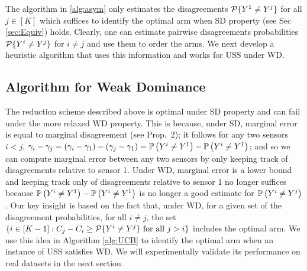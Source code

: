 The algorithm in \ref{alg:asym} only estimates the disagreements $\P\{Y^1 \neq Y^j\}$ for all $j \in [K]$ which suffices to identify the optimal arm when SD property (see Sec \ref{sec:Equiv}) holds. Clearly, one can estimate pairwise disagreements probabilities $\P\{Y^i \neq Y^j\}$ for $i\neq j$ and use them to order the arms. We next develop a heuristic algorithm that uses this information and works for USS under WD. 

\subsection{Algorithm for Weak Dominance}
The reduction scheme described above is optimal under SD property and can fail under the more relaxed WD property. This is because, under SD, marginal error is equal to marginal disagreement (see Prop.~2); it follows for any two sensors $i < j$, $\gamma_i-\gamma_j = (\gamma_i-\gamma_1) - (\gamma_j-\gamma_1) = \Prob{Y^i\ne Y^1} - \Prob{Y^i\ne Y^1}$; and so we can compute marginal error between any two sensors by only keeping track of disagreements relative to sensor 1. Under WD, marginal error is a lower bound and keeping track only of disagreements relative to sensor 1 no longer suffices because $\Prob{Y^i\ne Y^1} - \Prob{Y^i\ne Y^1}$ is no longer a good estimate for $\Prob{Y^i\ne Y^j}$.
%
Our key insight is based on the fact that,
under WD, for a given set of the disagreement probabilities, for all $i \neq j$, the set $\{i \in [K-1]: C_j - C_i \geq \P\{Y^i \neq Y^j\} \mbox{ for all } j>i\}$ includes the optimal arm. We use this idea in Algorithm \ref{alg:UCB} to identify the optimal arm when an instance of USS satisfies WD. We will experimentally validate its performance on real datasets in the next section.
